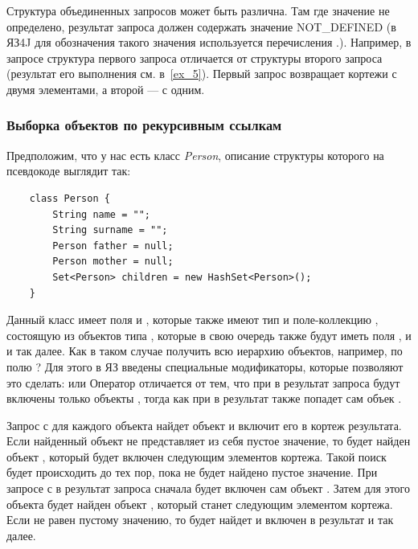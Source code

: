 Структура объединенных запросов может быть различна. Там где значение не определено, 
результат запроса должен содержать значение NOT\_DEFINED (в ЯЗ4J для обозначения
такого значения используется  перечисления .).
Например, в запросе
структура первого запроса отличается от структуры второго запроса (результат его выполнения
см. в~\ref{ex_5}). Первый запрос возвращает кортежи с двумя элементами, а второй --- с одним.







\subsubsection{Выборка объектов по рекурсивным ссылкам}
Предположим, что у нас есть класс {\it Person}, описание структуры которого на псевдокоде выглядит так:
\begin{verbatim}
    class Person {
        String name = "";
        String surname = "";
        Person father = null;
        Person mother = null;
        Set<Person> children = new HashSet<Person>();
    }
\end{verbatim}
Данный класс имеет поля  и , которые также имеют тип  и поле-коллекцию
, состоящую из объектов типа , которые в свою очередь также будут иметь
поля ,   и  и так далее. Как в таком случае получить всю 
иерархию объектов, например, по полю ? Для этого в ЯЗ введены специальные
модификаторы, которые позволяют это сделать:
или
Оператор \cl{+} отличается от \cl{*} тем, что при \cl{+} в результат запроса будут
включены только объекты , тогда как при \cl{*} в результат также 
попадет сам объек .

Запрос с \cl{+} для каждого объекта  найдет объект  и включит
его в кортеж результата. Если найденный объект не представляет
из себя пустое значение, то будет найден объект , который будет 
включен следующим элементов кортежа. Такой поиск будет происходить до тех пор, пока не будет
найдено пустое значение. 
При запросе с \cl{*} в результат запроса сначала будет включен сам объект . 
Затем для этого объекта будет найден объект , который станет
следующим элементом кортежа. Если  не равен пустому значению, то будет найдет
 и включен в результат и так далее.

